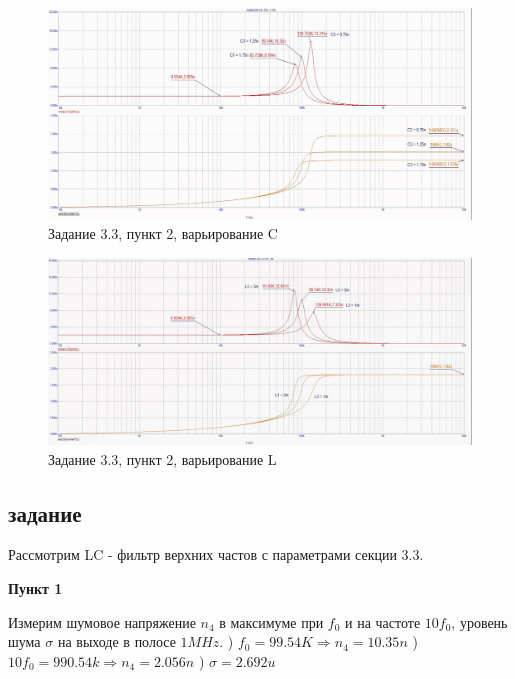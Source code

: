 \documentclass[a4paper, 14pt]{extarticle}%
\begin{document}
\newline

\begin{figure}[h!]
			\centering
			\includegraphics[width=1.1\linewidth]{3/3_3_3.jpg}
			\caption{Задание 3.3, пункт 2, варьирование C}
			\label{A}
\end{figure}

\newline

\begin{figure}[h!]
			\centering
			\includegraphics[width=1.1\linewidth]{3/3_3_4.jpg}
			\caption{Задание 3.3, пункт 2, варьирование L}
			\label{A}
\end{figure}

\subsection{задание}

Рассмотрим LC - фильтр верхних частов с параметрами секции 3.3.
\newline

\textbf{Пункт 1}
\newline

Измерим шумовое напряжение $n_4$ в максимуме при $f_0$ и на частоте $10f_0$, уровень шума $\sigma$ на выходе в полосе $1MHz$.
) $f_0 = 99.54K \Rightarrow n_4 = 10.35n $
) $10f_0 = 990.54k \Rightarrow n_4 = 2.056n$
) $\sigma = 2.692u$
\newline
\end{document}
